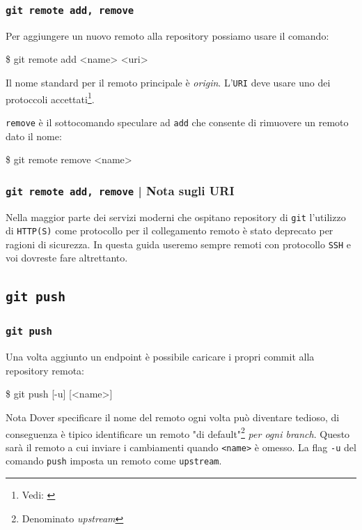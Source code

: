 \documentclass{beamer}
\begin{document}
\begin{frame}
  \frametitle{\texttt{git remote add, remove}}
  Per aggiungere un nuovo remoto alla repository possiamo usare il comando:
  \begin{semiverbatim}
  \$ git remote add <name> <uri>
  \end{semiverbatim}
  Il nome standard per il remoto principale \`e \emph{origin}. L'\texttt{URI}
  deve usare uno dei protoccoli accettati\footnote{Vedi:
    \href{https://stackoverflow.com/a/51112344}{}}.

    \pause
  \texttt{remove} \`e il sottocomando speculare ad \texttt{add} che consente di
  rimuovere un remoto dato il nome:
  \begin{semiverbatim}
  \$ git remote remove <name>
  \end{semiverbatim}
\end{frame}

\begin{frame}
  \frametitle{\texttt{git remote add, remove} | Nota sugli URI}
  Nella maggior parte dei servizi moderni che ospitano repository di \texttt{git}
  l'utilizzo di \texttt{HTTP(S)} come protocollo per il collegamento remoto \`e
  stato deprecato per ragioni di sicurezza. In questa guida useremo sempre
  remoti con protocollo \texttt{SSH} e voi dovreste fare altrettanto.
\end{frame}

\subsection{\texttt{git push}}
\begin{frame}
  \frametitle{\texttt{git push}}
  Una volta aggiunto un endpoint \`e possibile caricare i propri commit alla
  repository remota:
  \begin{semiverbatim}
  \$ git push [-u] [<name>]
  \end{semiverbatim} \pause
  \begin{block}{Nota}
    Dover specificare il nome del remoto ogni volta pu\`o diventare tedioso, di
    conseguenza \`e tipico identificare un remoto "di default"\footnote{Denominato \emph{upstream}}
    \emph{per ogni branch}. Questo sar\`a il remoto a cui inviare i cambiamenti
    quando \texttt{<name>} \`e omesso. La flag \texttt{-u} del comando \texttt{push}
    imposta un remoto come \texttt{upstream}.
  \end{block}
\end{frame}
\end{document}
